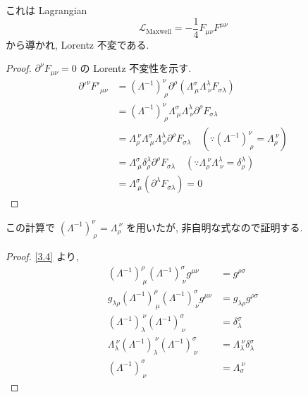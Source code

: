 \documentclass[a4paper,12pt]{article}
\begin{document}
これは Lagrangian
\begin{equation*}
\mathcal{L}_\text{Maxwell} = -\frac{1}{4} F_{\mu\nu} F^{\mu\nu} \tag{3.7}
\end{equation*}
から導かれ, Lorentz 不変である.

\color{blue}
\begin{proof}
$\partial^\nu F_{\mu\nu} = 0$ の Lorentz 不変性を示す.
\begin{align*}
  \partial'^\nu F'_{\mu\nu} &= (\Lambda^{-1})^\nu_{\ \rho} \partial^\rho (\Lambda^\sigma_{\ \mu} \Lambda^\lambda_{\ \nu} F_{\sigma\lambda}) \tag{3-1.d1} \\
  &= (\Lambda^{-1})^\nu_{\ \rho} \Lambda^\sigma_{\ \mu} \Lambda^\lambda_{\ \nu} \partial^\rho F_{\sigma\lambda} \tag{3-1.d2} \\
  &= \Lambda_\rho^{\ \nu} \Lambda^\sigma_{\ \mu} \Lambda^\lambda_{\ \nu} \partial^\rho F_{\sigma\lambda} \quad (\because (\Lambda^{-1})^\nu_{\ \rho} = \Lambda_\rho^{\ \nu}) \tag{3-1.d3} \\
  &= \Lambda^\sigma_{\ \mu} \delta^{\lambda}_{\rho} \partial^\rho F_{\sigma\lambda} \quad (\because \Lambda_\rho^{\ \nu} \Lambda^\lambda_{\ \nu} = \delta^{\lambda}_{\rho}) \tag{3-1.d4} \\
  &= \Lambda^\sigma_{\ \mu} (\partial^\lambda F_{\sigma\lambda}) = 0 \tag{3-1.d5} 
\end{align*}
\end{proof}
この計算で $(\Lambda^{-1})^\nu_{\ \rho} = \Lambda_\rho^{\ \nu}$ を用いたが, 非自明な式なので証明する.\\
\begin{proof}
\eqref{3.4} より,
\begin{align*}
  (\Lambda^{-1})^\rho_{\ \mu} (\Lambda^{-1})^\sigma_{\ \nu} g^{\mu\nu} &= g^{\rho\sigma} \tag{3-1.e1} \\
  g_{\lambda\rho}(\Lambda^{-1})^\rho_{\ \mu} (\Lambda^{-1})^\sigma_{\ \nu} g^{\mu\nu} &= g_{\lambda\rho}g^{\rho\sigma} \tag{3-1.e2}\\
  (\Lambda^{-1})_\lambda^{\ \nu} (\Lambda^{-1})^\sigma_{\ \nu} &= \delta^\sigma_{\lambda} \tag{3-1.e3}\\
  \Lambda_\lambda^{\ \nu} (\Lambda^{-1})_\lambda^{\ \nu} (\Lambda^{-1})^\sigma_{\ \nu} &= \Lambda_\lambda^{\ \nu} \delta^\sigma_{\lambda} \tag{3-1.e4}\\
  (\Lambda^{-1})^\sigma_{\ \nu} &= \Lambda_\sigma^{\ \nu} \tag{3-1.e5}
\end{align*}
\end{proof}
\end{document}
